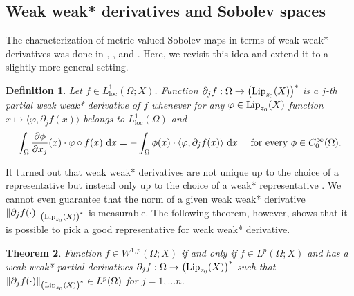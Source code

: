 \documentclass[reqno]{amsart}
\newtheorem{thm}{Theorem}[section]
\newtheorem{lem}[thm]{Lemma}
\newtheorem{defn}[thm]{Definition}
\def\upint{\mathchoice%
    {\mkern13mu\overline{\vphantom{\intop}\mkern7mu}\mkern-20mu}%
    {\mkern7mu\overline{\vphantom{\intop}\mkern7mu}\mkern-14mu}%
    {\mkern7mu\overline{\vphantom{\intop}\mkern7mu}\mkern-14mu}%
    {\mkern7mu\overline{\vphantom{\intop}\mkern7mu}\mkern-14mu}%
  \int}
\begin{document}
\subsection{Weak weak* derivatives and Sobolev spaces}
The characterization of metric valued Sobolev maps in terms of weak weak* derivatives
was done in \cite{CE:23}, \cite{CE:2021}, and \cite{CJP22}. 
Here, we revisit this idea and extend it to a slightly more general setting.
\begin{defn}\label{def:w**}
Let $f\in L^1_{\operatorname{loc}}(\Omega; X)$.
Function $\partial_j f:\Omega\to \left(\textnormal{Lip}_{z_0}(X)\right)^*$ is a $j$-th partial weak weak* derivative of $f$ whenever 
for any $\varphi \in \textnormal{Lip}_{z_0}(X)$ function $x\mapsto \langle \varphi, \partial_j f(x)\rangle$ belongs to $L^1_{\operatorname{loc}}(\Omega)$
and
\begin{equation}
\label{eq:def-w**}
\int_\Omega\frac{\partial \phi}{\partial x_j}(x)\cdot \varphi\circ f(x)\ \textnormal{d}x 
= -\int_\Omega\phi(x)\cdot \langle \varphi, \partial_j f(x) \rangle \ \textnormal{d}x \quad \textnormal{ for every } \phi \in C^\infty_0(\Omega).
\end{equation}
\end{defn}
It turned out that weak weak* derivatives are not unique up to the choice of a representative but instead only up to the choice of a weak* representative
\cite[Lemma 3.4]{CE:23}.
We cannot even guarantee that the norm of a given weak weak* derivative  $\|\partial_j f(\cdot) \|_{\left(\textnormal{Lip}_{z_0}(X)\right)^*}$ is measurable.
The following theorem, however, shows that it is possible to pick a good representative for weak weak* derivative. 
\begin{thm}\label{theorem:Sobolev-space}
Function $f\in W^{1,p}(\Omega;X)$ if and only if 
$f\in L^p(\Omega; X)$ and has a weak weak* partial derivatives $\partial_jf:\Omega\to \left(\textnormal{Lip}_{z_0}(X)\right)^*$
such that $\|\partial_j f(\cdot) \|_{\left(\textnormal{Lip}_{z_0}(X)\right)^*} \in L^p(\Omega)$ for $j=1,\dots n$.
\end{thm}
\end{document}
